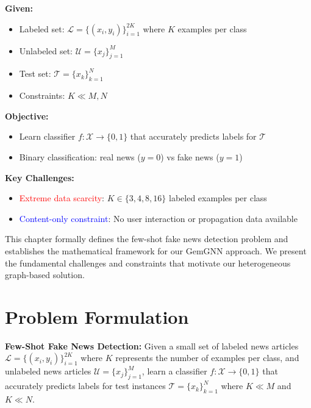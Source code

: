 
\vspace{0.3cm}

\textbf{Given:}
\begin{itemize}
    \item Labeled set: $\mathcal{L} = \{(x_i, y_i)\}_{i=1}^{2K}$ where $K$ examples per class
    \item Unlabeled set: $\mathcal{U} = \{x_j\}_{j=1}^{M}$ 
    \item Test set: $\mathcal{T} = \{x_k\}_{k=1}^{N}$
    \item Constraints: $K \ll M, N$
\end{itemize}

\vspace{0.3cm}

\textbf{Objective:}
\begin{itemize}
    \item Learn classifier $f: \mathcal{X} \rightarrow \{0, 1\}$ that accurately predicts labels for $\mathcal{T}$
    \item Binary classification: real news ($y = 0$) vs fake news ($y = 1$)
\end{itemize}

\vspace{0.3cm}

\textbf{Key Challenges:}
\begin{itemize}
    \item \textcolor{red}{Extreme data scarcity}: $K \in \{3, 4, 8, 16\}$ labeled examples per class
    \item \textcolor{blue}{Content-only constraint}: No user interaction or propagation data available
\end{itemize}


This chapter formally defines the few-shot fake news detection problem and establishes the mathematical framework for our GemGNN approach. We present the fundamental challenges and constraints that motivate our heterogeneous graph-based solution.

\section{Problem Formulation}

\textbf{Few-Shot Fake News Detection:} Given a small set of labeled news articles $\mathcal{L} = \{(x_i, y_i)\}_{i=1}^{2K}$ where $K$ represents the number of examples per class, and unlabeled news articles $\mathcal{U} = \{x_j\}_{j=1}^{M}$, learn a classifier $f: \mathcal{X} \rightarrow \{0,1\}$ that accurately predicts labels for test instances $\mathcal{T} = \{x_k\}_{k=1}^{N}$ where $K \ll M$ and $K \ll N$.

